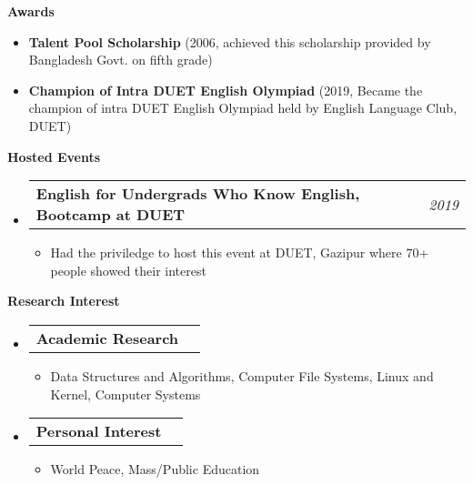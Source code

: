 \documentclass[letterpaper,10pt]{article}
\makeatletter
\newcommand{\resheading}[1]{{\large \colorbox{mygrey}{\begin{minipage}{\textwidth}{\textbf{#1 \vphantom{p\^{E}}}}\end{minipage}}}}
\newcommand{\ressubheading}[4]{
\begin{tabular*}{7.0in}{l@{\extracolsep{\fill}}r}
		\textbf{#1} & \textit{#4} \\
\end{tabular*}\vspace{-6pt}}
\makeatother
\begin{document}
\vspace{0.2in}

\resheading{Awards}
\begin{itemize}
    \item \textbf{Talent Pool Scholarship} (2006, achieved this scholarship provided by Bangladesh Govt. on fifth grade)
    \item \textbf{Champion of Intra DUET English Olympiad} (2019, Became the champion of intra DUET English Olympiad held by English Language Club, DUET)
\end{itemize}

\vspace{0.2in}

\resheading{Hosted Events}
\begin{itemize}
    \item \ressubheading{English for Undergrads Who Know English, Bootcamp at DUET}{}{}{2019}
    \begin{itemize}
        \item Had the priviledge to host this event at DUET, Gazipur where 70+ people showed their interest
    \end{itemize}
\end{itemize}

\vspace{0.2in}

\resheading{Research Interest}
\begin{itemize}
    \item \ressubheading{Academic Research}{}{}{}
    \begin{itemize}
        \item Data Structures and Algorithms, Computer File Systems, Linux and Kernel, Computer Systems
    \end{itemize}
    
\item \ressubheading{Personal Interest}{}{}{}
    \begin{itemize}
        \item World Peace, Mass/Public Education
    \end{itemize}
\end{itemize}
\end{document}
